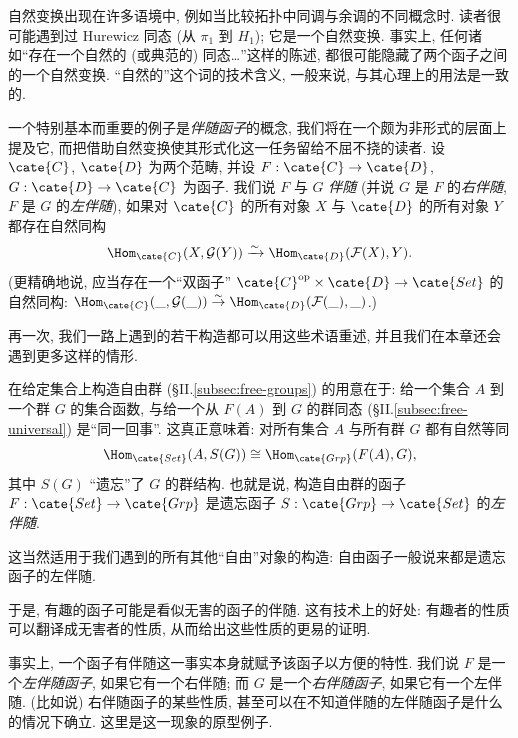自然变换出现在许多语境中, 例如当比较拓扑中同调与余调的不同概念时. 读者很可能遇到过 Hurewicz 同态 (从 $\pi_1$ 到 $H_1$); 它是一个自然变换. 事实上, 任何诸如``存在一个自然的 (或典范的) 同态\ldots''这样的陈述, 都很可能隐藏了两个函子之间的一个自然变换. ``自然的''这个词的技术含义, 一般来说, 与其心理上的用法是一致的.

一个特别基本而重要的例子是\emph{伴随函子}的概念, 我们将在一个颇为非形式的层面上提及它, 而把借助自然变换使其形式化这一任务留给不屈不挠的读者. 设 $\cate{C}$, $\cate{D}$ 为两个范畴, 并设 $F:\cate{C}\to\cate{D}$, $G:\cate{D}\to\cate{C}$ 为函子. 我们说 $F$ 与 $G$ \emph{伴随} (并说 $G$ 是 $F$ 的\emph{右伴随}, $F$ 是 $G$ 的\emph{左伴随}), 如果对 $\cate{C}$ 的所有对象 $X$ 与 $\cate{D}$ 的所有对象 $Y$ 都存在自然同构
\[
\Hom_{\cate{C}}(X,\mathcal{G}(Y))\xrightarrow{\sim}\Hom_{\cate{D}}(\mathcal{F}(X),Y).
\]
(更精确地说, 应当存在一个``双函子'' $\cate{C}^{\mathrm{op}}\times\cate{D}\to\cate{Set}$ 的自然同构: $\Hom_{\cate{C}}(\_,\mathcal{G}(\_))\stackrel{\sim}{\to}\Hom_{\cate{D}}(\mathcal{F}(\_),\_)$.)

再一次, 我们一路上遇到的若干构造都可以用这些术语重述, 并且我们在本章还会遇到更多这样的情形.

\begin{example}\label{ex:free-group-adjoint}
在给定集合上构造自由群 (§II.\ref{subsec:free-groups}) 的用意在于: 给一个集合 $A$ 到一个群 $G$ 的集合函数, 与给一个从 $F(A)$ 到 $G$ 的群同态 (§II.\ref{subsec:free-universal}) 是``同一回事''. 这真正意味着: 对所有集合 $A$ 与所有群 $G$ 都有自然等同
\[
\Hom_{\cate{Set}}(A,S(G))\cong\Hom_{\cate{Grp}}(F(A),G),
\]
其中 $S(G)$ ``遗忘''了 $G$ 的群结构. 也就是说, 构造自由群的函子 $F:\cate{Set}\to\cate{Grp}$ 是遗忘函子 $S:\cate{Grp}\to\cate{Set}$ 的\emph{左伴随}.

这当然适用于我们遇到的所有其他``自由''对象的构造: 自由函子一般说来都是遗忘函子的左伴随.
\end{example}

于是, 有趣的函子可能是看似无害的函子的伴随. 这有技术上的好处: 有趣者的性质可以翻译成无害者的性质, 从而给出这些性质的更易的证明.

事实上, 一个函子有伴随这一事实本身就赋予该函子以方便的特性. 我们说 $F$ 是一个\emph{左伴随函子}, 如果它有一个右伴随; 而 $G$ 是一个\emph{右伴随函子}, 如果它有一个左伴随. (比如说) 右伴随函子的某些性质, 甚至可以在不知道伴随的左伴随函子是什么的情况下确立. 这里是这一现象的原型例子.

